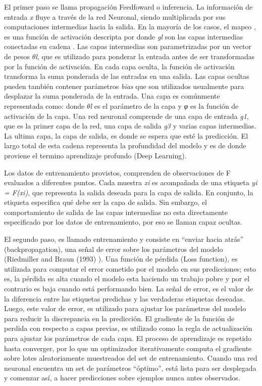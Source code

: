 El primer paso se llama propagación Feedfoward o inferencia. La información de entrada \textit{x} fluye a través de la red Neuronal, siendo multiplicada por sus computaciones intermedias hacia la salida. En la mayoría de los casos, el mapeo ,  es una función de activación descripta por  donde \textit{gl} son las capas intermedias conectadas en cadena . Las capas intermedias son parametrizadas por un vector de pesos \textit{$\theta$l}, que es utilizado para ponderar la entrada antes de ser transformadas por la función de activación. En cada capa oculta, la función de activación transforma la suma ponderada de las entradas en una salida. Las capas ocultas pueden también contener parámetros \textit{bias} que son utilizados usualmente para desplazar la suma ponderada de la entrada. Una capa es comúnmente representada como:  donde \textit{$\theta$l} es el parámetro de la capa y \textit{φ} es la función de activación de la capa. Una red neuronal comprende de una capa de entrada \textit{g1}, que es la primer capa de la red, una capa de salida \textit{g3} y varias capas intermedias. La ultima capa, la capa de salida, es donde se espera que esté la predicción.
El largo total de esta cadena representa la profundidad del modelo y es de donde proviene el termino aprendizaje profundo (Deep Learning).

Los datos de entrenamiento provistos, comprenden de observaciones de F evaluados a diferentes puntos. Cada muestra \textit{xi} es acompañada de una etiqueta \textit{yi = F(xi)}, que representa la salida deseada para la capa de salida. En conjunto, la etiqueta especifica qué debe ser la capa de salida. Sin embargo, el comportamiento de salida de las capas intermedias no esta directamente especificado por los datos de entrenamiento, por eso se llaman capaz ocultas.

El segundo paso, es llamado entrenamiento y consiste en ``enviar hacia atrás'' (backpropagation), una señal de error sobre los parámetros del modelo (Riedmiller and Braun (1993) \cite{Riedmiller1993ADA}). Una función de pérdida (Loss function), es utilizada para computar el error cometido por el modelo en sus predicciones; esto es, la pérdida es alta cuando el modelo esta haciendo un trabajo pobre y por el contrario es baja cuando está performando bien. La señal de error, es el valor de la diferencia entre las etiquetas predichas y las verdaderas etiquetas deseadas. Luego, este valor de error, es utilizado para ajustar los parámetros del modelo para reducir la discrepancia en la predicción. El gradiente de la función de perdida con respecto a capas previas, es utilizado como la regla de actualización para ajustar los parámetros de cada capa. El proceso de aprendizaje es repetido hasta converger, por lo que un optimizador iterativamente computa el gradiente sobre lotes aleatoriamente muestreados del set de entrenamiento. Cuando una red neuronal encuentra un set de parámetros ``óptimo'', está lista para ser desplegada y comenzar así, a hacer predicciones sobre ejemplos nunca antes observados.

